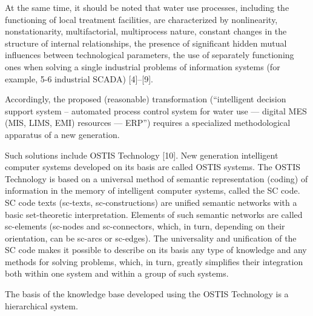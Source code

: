 \documentclass[a4paper, 10pt,twocolumn]{article}
\begin{document}
\par At the same time, it should be noted that water use
processes, including the functioning of local
treatment
facilities, are characterized by nonlinearity, nonstationarity, multifactorial, multiprocess nature, constant changes
in the structure of internal relationships, the presence of
significant hidden mutual influences between technological parameters, the use of separately functioning ones
when solving a single industrial problems of information
systems (for example, 5-6 industrial SCADA) [4]–[9].
\par Accordingly, the proposed (reasonable) transformation
(“intelligent decision support system – automated process
control system for water use — digital MES (MIS,
LIMS, EMI) resources — ERP”) requires a specialized
methodological apparatus of a new generation.
\par Such solutions include OSTIS Technology [10]. New
generation intelligent computer systems developed on its
basis are called OSTIS systems. The OSTIS Technology
is based on a universal method of semantic representation
(coding) of information in the memory of intelligent
computer systems, called the SC code. SC code texts
(sc-texts, sc-constructions) are unified semantic networks
with a basic set-theoretic interpretation. Elements of
such semantic networks are called sc-elements (sc-nodes
and sc-connectors, which, in turn, depending on their
orientation, can be sc-arcs or sc-edges). The universality
and unification of the SC code makes it possible to
describe on its basis any type of knowledge and any
methods for solving problems, which, in turn, greatly
simplifies their integration both within one system and
within a group of such systems.

\par The basis of the knowledge base developed using the
OSTIS Technology is a hierarchical system.
\end{document}

